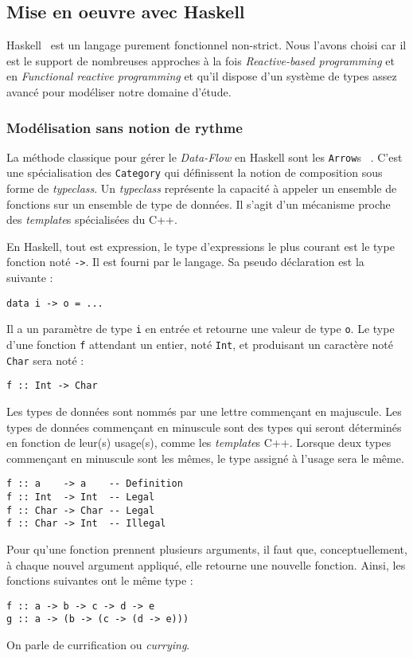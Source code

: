 \documentclass{llncs}
\newcommand{\DF}{\emph{Data-Flow} }
\newcommand{\RP}{\emph{Reactive-based programming} }
\newcommand{\FRP}{\emph{Functional reactive programming} }
\newcommand{\Arrs}{\lstinline{Arrow}s }
\begin{document}
\subsection{Mise en oeuvre avec Haskell}
Haskell~\cite{Haskell10} est un langage purement fonctionnel non-strict.
Nous l'avons choisi car il est le support de nombreuses approches à la fois \RP
et en \FRP et qu'il dispose d'un système de types assez avancé pour modéliser
notre domaine d'étude.

\subsubsection{Modélisation sans notion de rythme}
La méthode classique pour gérer le \DF en Haskell sont les \Arrs~\cite{Hughes00}.
C'est une spécialisation des \lstinline{Category}
qui définissent la notion de composition sous forme de \emph{typeclass}.
Un \emph{typeclass} représente la capacité à appeler un ensemble
de fonctions sur un ensemble de type de données.
Il s'agit d'un mécanisme proche des \emph{template}s spécialisées du C++.

En Haskell, tout est expression, le type d'expressions le plus courant est le type
fonction noté \lstinline{->}.
Il est fourni par le langage.
Sa pseudo déclaration est la suivante :
\begin{lstlisting}
data i -> o = ...
\end{lstlisting}
Il a un paramètre de type \lstinline{i} en entrée et retourne une
valeur de type \lstinline{o}.
Le type d'une fonction \lstinline{f} attendant un entier, noté \lstinline{Int}, et
produisant un caractère noté \lstinline{Char} sera noté :
\begin{lstlisting}
f :: Int -> Char
\end{lstlisting}

Les types de données sont nommés par une lettre commençant en majuscule.
Les types de données commençant en minuscule sont des types qui seront déterminés
en fonction de leur(s) usage(s), comme les \emph{template}s C++.
Lorsque deux types commençant en minuscule sont les mêmes, le type assigné à
l'usage sera le même.
\begin{lstlisting}
f :: a    -> a    -- Definition
f :: Int  -> Int  -- Legal
f :: Char -> Char -- Legal
f :: Char -> Int  -- Illegal
\end{lstlisting}

Pour qu'une fonction prennent plusieurs arguments, il faut que, conceptuellement,
à chaque nouvel argument appliqué, elle retourne une nouvelle fonction.
Ainsi, les fonctions suivantes ont le même type :
\begin{lstlisting}
f :: a -> b -> c -> d -> e
g :: a -> (b -> (c -> (d -> e)))
\end{lstlisting}
On parle de currification ou \emph{currying}.
\end{document}

